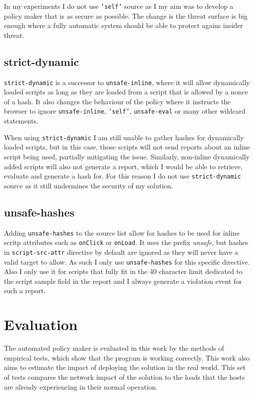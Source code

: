 \begin{description}
In my experiments I do not use \texttt{'self'} source as I my aim was to develop a policy maker that is as secure as possible.
The change is the threat surface is big enough where a fully automatic system should be able to protect agains insider threat.

\subsection{strict-dynamic}

\texttt{strict-dynamic} is a successor to \texttt{unsafe-inline}, where it will allow dynamically loaded scripts as long as they are loaded from a script that is allowed by a nonce of a hash.
It also changes the behaviour of the policy where it instructs the browser to ignore \texttt{unsafe-inline}, \texttt{'self'}, \texttt{unsafe-eval} or many other wildcard statements.

When using \texttt{strict-dynamic} I am still unable to gather hashes for dynamically loaded scripts, but in this case, those scripts will not send reports about an inline script being used, partially mitigating the issue.
Similarly, non-inline dynamically added scripts will also not generate a report, which I would be able to retrieve, evaluate and generate a hash for.
For this reason I do not use \texttt{strict-dynamic} source as it still undermines the security of my solution.

\subsection{unsafe-hashes}

Adding \texttt{unsafe-hashes} to the source list allow for hashes to be used for inline scritp attributes such as \texttt{onClick} or \texttt{onLoad}.
It uses the prefix {\it unsafe}, but hashes in \texttt{script-src-attr} directive by default are ignored as they will never have a valid target to allow.
As such I only use \texttt{unsafe-hashes} for this specific directive. 
Also I only use it for scripts that fully fit in the 40 character limit dedicated to the script sample field in the report and I always generate a violation event for such a report.

\section{Evaluation}

The automated policy maker is evaluated in this work by the methods of empirical tests, which show that the program is working correctly.
This work also aims to estimate the impact of deploying the solution in the real world.
This set of tests compares the network impact of the solution to the loads that the hosts are already experiencing in their normal operation.


\end{description}
